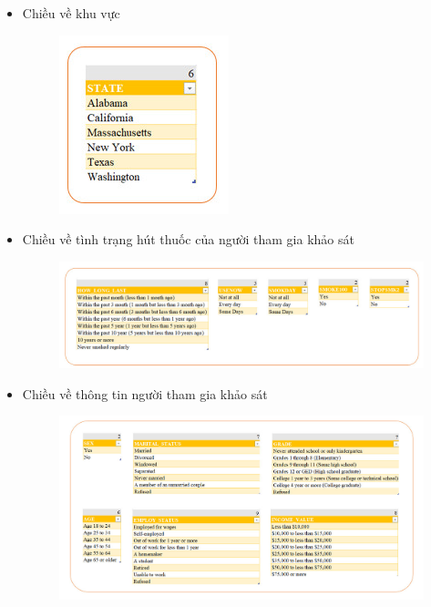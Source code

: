 \begin{itemize}
    \newpage 
    \item Chiều về khu vực
    \begin{center}
            \begin{figure}[!h]
                \centering
                \includegraphics[scale = 0.6]{van/dim_kv.png}
            \end{figure}
    \end{center} 
    \item Chiều về tình trạng hút thuốc của người tham gia khảo sát 
    \begin{center}
            \begin{figure}[!h]
                \centering
                \includegraphics[scale = 0.4]{van/dim_tt.png}
            \end{figure}
    \end{center}
    \item Chiều về thông tin người tham gia khảo sát
    \begin{center}
            \begin{figure}[!h]
                \centering
                \includegraphics[scale = 0.4]{van/dim_inf.png}
            \end{figure}
    \end{center}
    
\end{itemize}

